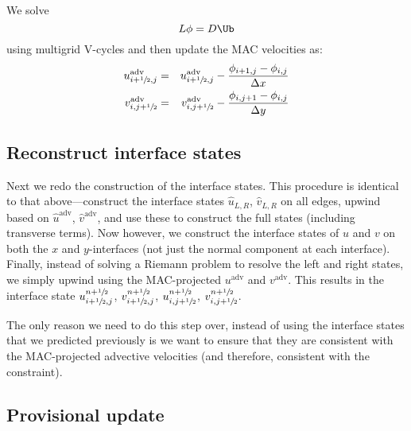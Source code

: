 We solve
\begin{equation}
L\phi = D\Ub
\end{equation}
using multigrid V-cycles and then update the MAC velocities as:
\begin{eqnarray}
u^\mathrm{adv}_{i+\myhalf,j} &=& u^\mathrm{adv}_{i+\myhalf,j} -
    \frac{\phi_{i+1,j} - \phi_{i,j}}{\Delta x} \\
%
v^\mathrm{adv}_{i,j+\myhalf} &=& v^\mathrm{adv}_{i,j+\myhalf} -
    \frac{\phi_{i,j+1} - \phi_{i,j}}{\Delta y}
\end{eqnarray}


\subsection{Reconstruct interface states}

Next we redo the construction of the interface states.  This procedure
is identical to that above---construct the interface states
$\hat{u}_{L,R}$, $\hat{v}_{L,R}$ on all edges, upwind based on
$\hat{u}^\mathrm{adv}$, $\hat{v}^\mathrm{adv}$, and use these to
construct the full states (including transverse terms).  Now however,
we construct the interface states of $u$ and $v$ on both the $x$ and
$y$-interfaces (not just the normal component at each interface).
Finally, instead of solving a Riemann problem to resolve the left and
right states, we simply upwind using the MAC-projected
$u^\mathrm{adv}$ and $v^\mathrm{adv}$.  This results in the interface
state $u^{n+{\sfrac{1}{2}}}_{i+{\sfrac{1}{2}},j}$, $v^{n+{\sfrac{1}{2}}}_{i+{\sfrac{1}{2}},j}$, $u^{n+{\sfrac{1}{2}}}_{i,j+{\sfrac{1}{2}}}$,
$v^{n+{\sfrac{1}{2}}}_{i,j+{\sfrac{1}{2}}}$.

The only reason we need to do this step over, instead of using the
interface states that we predicted previously is we want to ensure
that they are consistent with the MAC-projected advective velocities
(and therefore, consistent with the constraint).

\subsection{Provisional update}

